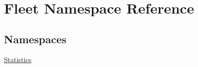 \hypertarget{namespace_fleet}{}\section{Fleet Namespace Reference}
\label{namespace_fleet}
\subsection*{Namespaces}
\begin{DoxyCompactItemize}
\item 
 \hyperlink{namespace_fleet_1_1_statistics}{Statistics}
\end{DoxyCompactItemize}
